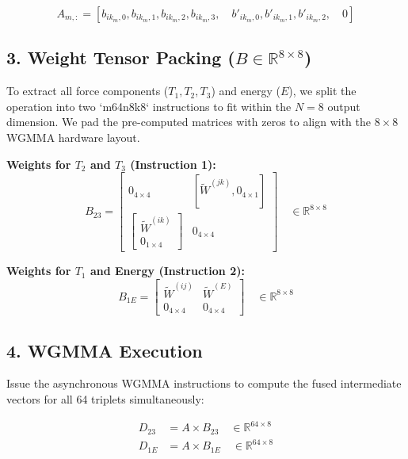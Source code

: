 \documentclass[12pt]{article}
\begin{document}
\begin{equation}
A_{m, :} = \left[ b_{ik_m, 0}, b_{ik_m, 1}, b_{ik_m, 2}, b_{ik_m, 3}, \quad b'_{ik_m, 0}, b'_{ik_m, 1}, b'_{ik_m, 2}, \quad 0 \right]
\end{equation}

\subsection*{3. Weight Tensor Packing ($B \in \mathbb{R}^{8 \times 8}$)}
To extract all force components ($T_1, T_2, T_3$) and energy ($E$), we split the operation into two `m64n8k8` instructions to fit within the $N=8$ output dimension. We pad the pre-computed matrices with zeros to align with the $8 \times 8$ WGMMA hardware layout.

\textbf{Weights for $T_2$ and $T_3$ (Instruction 1):}
\begin{equation}
B_{23} = \begin{bmatrix} 
0_{4 \times 4} & \left[ \widetilde{W}^{(jk)}, 0_{4 \times 1} \right] \\ 
\begin{bmatrix} \widetilde{W}^{(ik)} \\ 0_{1 \times 4} \end{bmatrix} & 0_{4 \times 4} 
\end{bmatrix} \quad \in \mathbb{R}^{8 \times 8}
\end{equation}

\textbf{Weights for $T_1$ and Energy (Instruction 2):}
\begin{equation}
B_{1E} = \begin{bmatrix} 
\widetilde{W}^{(ij)} & \widetilde{W}^{(E)} \\ 
0_{4 \times 4} & 0_{4 \times 4} 
\end{bmatrix} \quad \in \mathbb{R}^{8 \times 8}
\end{equation}

\subsection*{4. WGMMA Execution}
Issue the asynchronous WGMMA instructions to compute the fused intermediate vectors for all 64 triplets simultaneously:

\begin{align}
D_{23} &= A \times B_{23} \quad \in \mathbb{R}^{64 \times 8} \\
D_{1E} &= A \times B_{1E} \quad \in \mathbb{R}^{64 \times 8}
\end{align}
\end{document}
